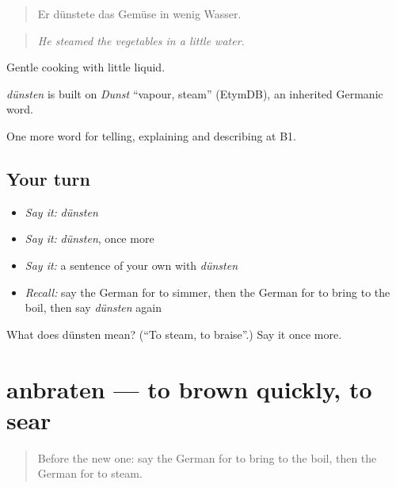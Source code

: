 \begin{quote}
Er dünstete das Gemüse in wenig Wasser.
\end{quote}

\begin{quote}
\emph{He steamed the vegetables in a little water.}
\end{quote}

Gentle cooking with little liquid.

\begin{cousinweb}
\emph{dünsten} is built on \emph{Dunst} \textquotedblleft{}vapour, steam\textquotedblright{} (EtymDB), an inherited Germanic word.
\end{cousinweb}

\begin{grammarlens}[title={What you've built}]
One more word for telling, explaining and describing at B1.
\end{grammarlens}

\subsection*{Your turn}
\begin{itemize}
\raggedright
  \item \emph{Say it:} \emph{dünsten}
  \item \emph{Say it:} \emph{dünsten}, once more
  \item \emph{Say it:} a sentence of your own with \emph{dünsten}
  \item \emph{Recall:} say the German for to simmer, then the German for to bring to the boil, then say \emph{dünsten} again
\end{itemize}

\begin{tcolorbox}[breakable,colback=teal!4,colframe=teal!35!black,title={Before you move on}]
What does dünsten mean? (\textquotedblleft{}To steam, to braise\textquotedblright{}.) Say it once more.
\end{tcolorbox}
\section[anbraten]{anbraten — to brown quickly, to sear}

\label{lesson:GE-C327-anbraten}



\begin{quote}
Before the new one: say the German for to bring to the boil, then the German for to steam.
\end{quote}

